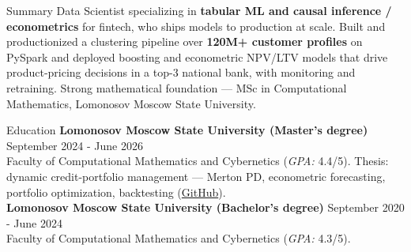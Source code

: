 \documentclass{resume}
\begin{document}
	\begin{rSection}{Summary}
		Data Scientist specializing in \textbf{tabular ML and causal inference / econometrics} for
		fintech, who ships models to production at scale. Built and productionized a clustering
		pipeline over \textbf{120M+ customer profiles} on PySpark and deployed boosting and
		econometric NPV/LTV models that drive product-pricing decisions in a top-3 national bank,
		with monitoring and retraining. Strong mathematical foundation --- MSc in Computational
		Mathematics, Lomonosov Moscow State University.
	\end{rSection}

	\begin{rSection}{Education}
		\textbf{Lomonosov Moscow State University (Master's degree)} \hfill {September 2024 - June 2026}\\
		Faculty of Computational Mathematics and Cybernetics (\textit{GPA:} 4.4/5).
		Thesis: dynamic credit-portfolio management --- Merton PD, econometric forecasting,
		portfolio optimization, backtesting
		(\href{https://github.com/MaximKiryakin/credit-portfolio-management}{GitHub}).\\
		\textbf{Lomonosov Moscow State University (Bachelor's degree)} \hfill {September 2020 - June 2024}\\
		Faculty of Computational Mathematics and Cybernetics (\textit{GPA:} 4.3/5).
	\end{rSection}
\end{document}
